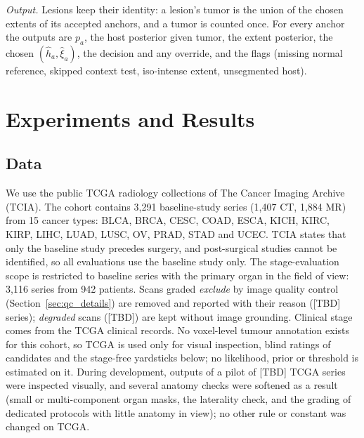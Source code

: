 \documentclass[fleqn,10pt]{olplainarticle}
\begin{document}
\emph{Output.} Lesions keep their identity: a lesion's tumor is the union of the chosen extents of its accepted anchors, and a
tumor is counted once. For every anchor the outputs are $p_a$, the host posterior given tumor, the extent posterior, the
chosen $(\hat h_a,\hat\xi_a)$, the decision and any override, and the flags (missing normal reference, skipped context test,
iso-intense extent, unsegmented host).


\section{Experiments and Results}
\label{sec:results}

\subsection{Data}
We use the public TCGA radiology collections of The Cancer Imaging Archive (TCIA). The cohort contains 3{,}291
baseline-study series (1{,}407 CT, 1{,}884 MR) from 15 cancer types: BLCA, BRCA, CESC, COAD, ESCA, KICH, KIRC, KIRP,
LIHC, LUAD, LUSC, OV, PRAD, STAD and UCEC. TCIA states that only the baseline study precedes surgery, and post-surgical
studies cannot be identified, so all evaluations use the baseline study only. The stage-evaluation scope is restricted
to baseline series with the primary organ in the field of view: 3{,}116 series from 942 patients. Scans graded \emph{exclude} by image quality control (Section~\ref{sec:qc_details}) are removed and reported with their reason ([TBD] series); \emph{degraded} scans ([TBD]) are kept without image grounding. Clinical stage comes
from the TCGA clinical records. No voxel-level tumour annotation exists for this cohort, so TCGA is used only for visual
inspection, blind ratings of candidates and the stage-free yardsticks below; no likelihood, prior or threshold is estimated
on it. During development, outputs of a pilot of [TBD] TCGA series were inspected visually, and several anatomy checks were
softened as a result (small or multi-component organ masks, the laterality check, and the grading of dedicated protocols
with little anatomy in view); no other rule or constant was changed on TCGA.
\end{document}
